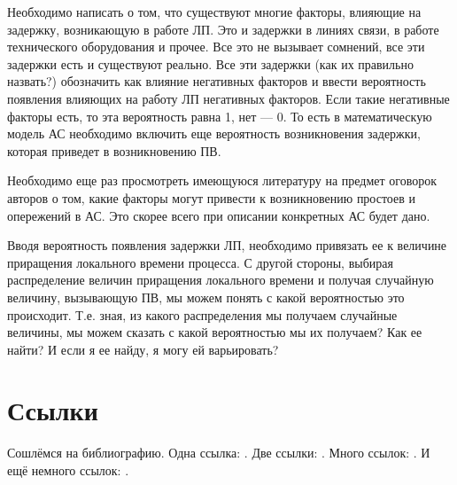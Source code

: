 Необходимо написать о том, что существуют многие факторы, влияющие на задержку, возникающую в работе ЛП. Это и задержки в линиях связи, в работе технического оборудования и прочее. Все это не вызывает сомнений, все эти задержки есть и существуют реально. Все эти задержки (как их правильно назвать?) обозначить как влияние негативных факторов и ввести вероятность появления влияющих на работу ЛП негативных факторов. Если такие негативные факторы есть, то эта вероятность равна 1, нет --- 0. То есть в математическую модель АС необходимо включить еще вероятность возникновения задержки, которая приведет в возникновению ПВ.

Необходимо еще раз просмотреть имеющуюся литературу на предмет оговорок авторов о том, какие факторы могут привести к возникновению простоев и опережений в АС. Это скорее всего при описании конкретных АС будет дано.

Вводя вероятность появления задержки ЛП, необходимо привязать ее к величине приращения локального времени процесса. С другой стороны, выбирая распределение величин приращения локального времени и получая случайную величину, вызывающую ПВ, мы можем понять с какой вероятностью это происходит. Т.е. зная, из какого распределения мы получаем случайные величины, мы можем сказать с какой вероятностью мы их получаем? Как ее найти? И если я ее найду, я могу ей варьировать?






\newpage

\section{Ссылки} \label{sect1_2}
Сошлёмся на библиографию. Одна ссылка: \cite[с.~54]{Sokolov}\cite[с.~36]{Gaidaenko}. Две ссылки: \cite{Sokolov,Gaidaenko}. Много ссылок:  \cite[с.~54]{Lermontov,Management,Borozda} \cite{Lermontov,Management,Borozda,Marketing,Constitution,FamilyCode,Gost.7.0.53,Razumovski,Lagkueva,Pokrovski,Sirotko,Lukina,Methodology,Encyclopedia,Nasirova,Berestova,Kriger}. И ещё немного ссылок: \cite{Article,Book,Booklet,Conference,Inbook,Incollection,Manual,Mastersthesis,Misc,Phdthesis,Proceedings,Techreport,Unpublished}. \cite{medvedev2006jelektronnye, CEAT:CEAT581, doi:10.1080/01932691.2010.513279,Gosele1999161,Li2007StressAnalysis, Shoji199895,test:eisner-sample,AB_patent_Pomerantz_1968,iofis_patent1960}

